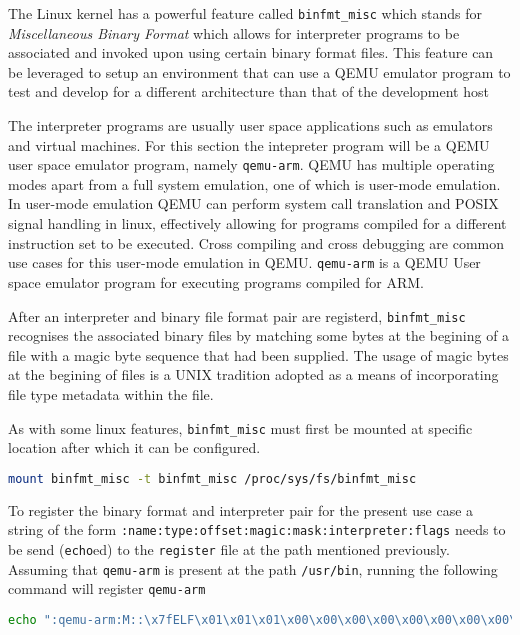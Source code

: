 The Linux kernel has a powerful feature called \texttt{binfmt\_misc} which stands for \textit{Miscellaneous Binary Format} which allows for interpreter programs to be associated and invoked upon using certain binary format files. This feature can be leveraged to setup an environment that can use a QEMU emulator program to test and develop for a different architecture than that of the development host

The interpreter programs are usually user space applications such as emulators and virtual machines. For this section the intepreter program will be a QEMU user space emulator program, namely \texttt{qemu-arm}. QEMU has multiple operating modes apart from a full system emulation, one of which is user-mode emulation. In user-mode emulation QEMU can perform system call translation and POSIX signal handling in linux, effectively allowing for programs compiled for a different instruction set to be executed. Cross compiling and cross debugging are common use cases for this user-mode emulation in QEMU. \texttt{qemu-arm} is a QEMU User space emulator program for executing programs compiled for ARM.

After an interpreter and binary file format pair are registerd, \texttt{binfmt\_misc} recognises the associated binary files by matching some bytes at the begining of a file with a magic byte sequence that had been supplied. The usage of magic bytes at the begining of files is a UNIX tradition adopted as a means of incorporating file type metadata within the file.

As with some linux features, \texttt{binfmt\_misc} must first be mounted at specific location after which it can be configured.

\begin{lstlisting}[language=Bash]
	mount binfmt_misc -t binfmt_misc /proc/sys/fs/binfmt_misc
\end{lstlisting}

To register the binary format and interpreter pair for the present use case a string of the form \texttt{:name:type:offset:magic:mask:interpreter:flags} needs to be send (\texttt{echo}ed) to the \texttt{register} file at the path mentioned previously. Assuming that \texttt{qemu-arm} is present at the path \texttt{/usr/bin}, running the following command will register \texttt{qemu-arm}

\begin{lstlisting}[language=Bash]
	echo ":qemu-arm:M::\x7fELF\x01\x01\x01\x00\x00\x00\x00\x00\x00\x00\x00\x00\x02\x00\x28\x00:\xff\xff\xff\xff\xff\xff\xff\x00\xff\xff\xff\xff\xff\xff\xff\xff\xfe\xff\xff\xff:/usr/bin/qemu-arm-static:F" > /proc/sys/fs/binfmt_misc
\end{lstlisting}

